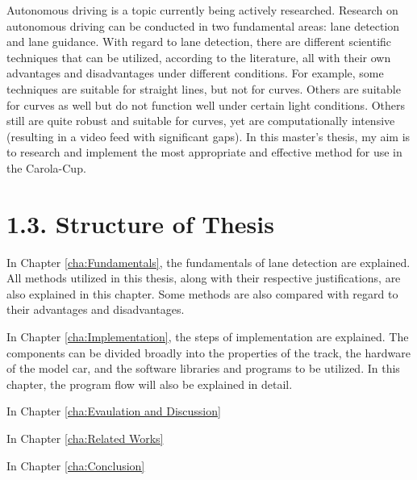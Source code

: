 Autonomous driving is a topic currently being actively researched. Research on 
autonomous driving can be conducted in two fundamental areas: lane detection and lane 
guidance. With regard to lane detection, there are different scientific techniques that 
can be utilized, according to the literature, all with their own advantages and 
disadvantages under different conditions. For example, some techniques are suitable for 
straight lines, but not for curves. Others are suitable for curves as well but do not 
function well under certain light conditions. Others still are quite robust and 
suitable for curves, yet are computationally intensive (resulting in a video feed with 
significant gaps). In this master's thesis, my aim is to research and implement the 
most appropriate and effective method for use in the Carola-Cup.



\section*{1.3. Structure of Thesis}
\label{sec:Structure of Paper}

In Chapter \ref{cha:Fundamentals}, the fundamentals of lane detection are explained. All 
methods utilized in this thesis, along with their respective justifications, are also 
explained in this chapter. Some methods are also compared with regard to their 
advantages and disadvantages.


In Chapter \ref{cha:Implementation}, the steps of implementation are explained. The 
components can be divided broadly into the properties of the track, the hardware of the 
model car, and the software libraries and programs to be utilized. In this chapter, the 
program flow will also be explained in detail.

In Chapter \ref{cha:Evaulation and Discussion}

In Chapter \ref{cha:Related Works}

In Chapter \ref{cha:Conclusion}

